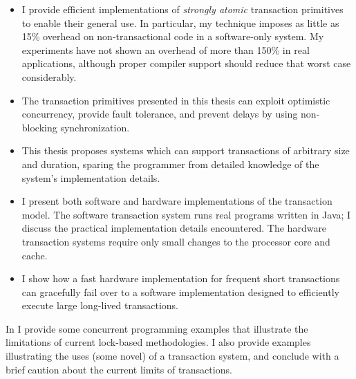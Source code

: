 \begin{itemize}
\item I provide efficient implementations of
\textit{strongly atomic} transaction primitives to enable their general use.
In particular, my technique imposes as little as 15\% overhead on
non-transactional code in a software-only system.  My experiments have
not shown an overhead of more than 150\% in real applications,
although proper compiler support should reduce that worst case
considerably.%

\item The transaction
primitives presented in this thesis can exploit optimistic
concurrency, provide fault tolerance, and prevent delays by using
non-blocking synchronization.

\item This thesis proposes systems which can support transactions of
arbitrary size and duration, sparing the programmer from detailed
knowledge of the system's implementation details.

\item I present both software and hardware implementations of the
transaction model.
The software transaction system runs real programs written in
Java; I discuss the practical implementation details encountered.
The hardware transaction systems require only small changes to the
processor core and cache.

\item I show how a fast hardware implementation for
frequent short transactions can gracefully fail over to a software
implementation designed to efficiently execute large long-lived
transactions.
\end{itemize}

In  I provide some concurrent programming
examples that illustrate the limitations of current lock-based
methodologies.  I also provide examples illustrating the uses
(some novel) of a transaction system, and conclude with a brief
caution about the current limits of transactions.

